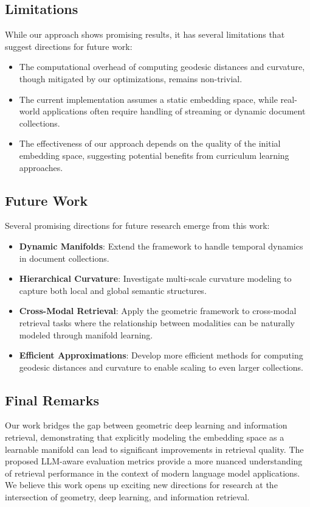 \subsection{Limitations}

While our approach shows promising results, it has several limitations that suggest directions for future work:

\begin{itemize}
    \item The computational overhead of computing geodesic distances and curvature, though mitigated by our optimizations, remains non-trivial.
    
    \item The current implementation assumes a static embedding space, while real-world applications often require handling of streaming or dynamic document collections.
    
    \item The effectiveness of our approach depends on the quality of the initial embedding space, suggesting potential benefits from curriculum learning approaches.
\end{itemize}

\subsection{Future Work}

Several promising directions for future research emerge from this work:

\begin{itemize}
    \item \textbf{Dynamic Manifolds}: Extend the framework to handle temporal dynamics in document collections.
    
    \item \textbf{Hierarchical Curvature}: Investigate multi-scale curvature modeling to capture both local and global semantic structures.
    
    \item \textbf{Cross-Modal Retrieval}: Apply the geometric framework to cross-modal retrieval tasks where the relationship between modalities can be naturally modeled through manifold learning.
    
    \item \textbf{Efficient Approximations}: Develop more efficient methods for computing geodesic distances and curvature to enable scaling to even larger collections.
\end{itemize}

\subsection{Final Remarks}

Our work bridges the gap between geometric deep learning and information retrieval, demonstrating that explicitly modeling the embedding space as a learnable manifold can lead to significant improvements in retrieval quality. The proposed LLM-aware evaluation metrics provide a more nuanced understanding of retrieval performance in the context of modern language model applications. We believe this work opens up exciting new directions for research at the intersection of geometry, deep learning, and information retrieval.
